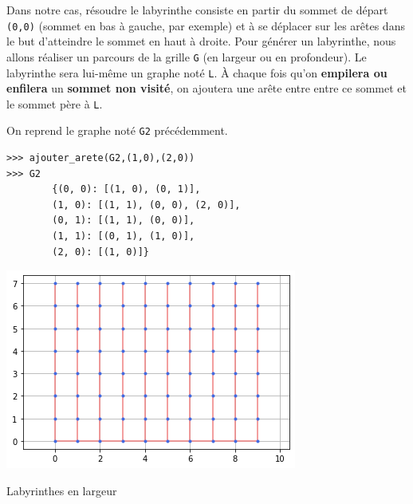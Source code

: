 Dans notre cas, résoudre le labyrinthe consiste en partir du sommet de départ \lstinline{(0,0)} (sommet en bas à gauche, par exemple) et à se déplacer sur les arêtes dans le but d'atteindre le sommet en haut à droite. 
Pour générer un labyrinthe, nous allons réaliser un parcours de la grille \lstinline{G} (en largeur ou en profondeur). Le labyrinthe sera lui-même un graphe noté \lstinline{L}. À chaque fois qu'on \textbf{empilera ou enfilera} un \textbf{sommet non visité}, on ajoutera une arête entre entre ce sommet et le sommet père à \lstinline{L}. 




\begin{exemple}
On reprend le graphe noté \lstinline{G2} précédemment. 

\end{exemple}
\begin{lstlisting}
>>> ajouter_arete(G2,(1,0),(2,0))
>>> G2
        {(0, 0): [(1, 0), (0, 1)],
        (1, 0): [(1, 1), (0, 0), (2, 0)],
        (0, 1): [(1, 1), (0, 0)],
        (1, 1): [(0, 1), (1, 0)],
        (2, 0): [(1, 0)]}
\end{lstlisting}

\begin{marginfigure}[-2cm]
\includegraphics[width=\linewidth]{grille_10_8_largeur.png}
\caption{Labyrinthes en largeur}
\end{marginfigure}

